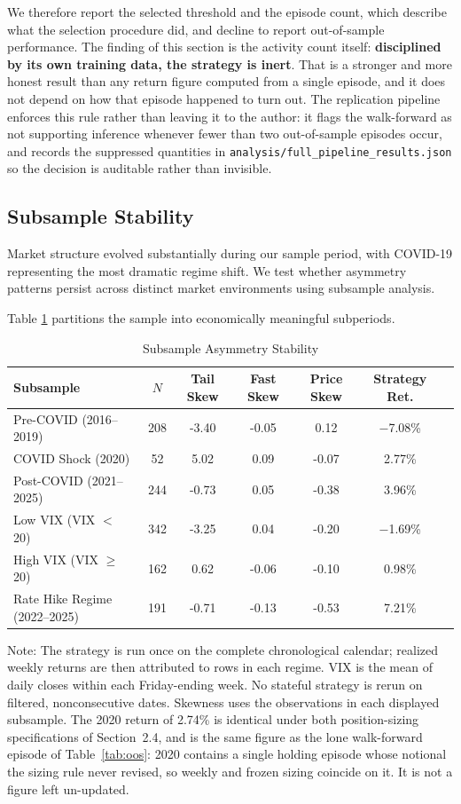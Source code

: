 \documentclass[11pt]{article}
\begin{document}
We therefore report the selected threshold and the episode count, which describe what the selection procedure did, and decline to report out-of-sample performance. The finding of this section is the activity count itself: \textbf{disciplined by its own training data, the strategy is inert}. That is a stronger and more honest result than any return figure computed from a single episode, and it does not depend on how that episode happened to turn out. The replication pipeline enforces this rule rather than leaving it to the author: it flags the walk-forward as not supporting inference whenever fewer than two out-of-sample episodes occur, and records the suppressed quantities in \texttt{analysis/full\_pipeline\_results.json} so the decision is auditable rather than invisible.

\subsection{Subsample Stability}

Market structure evolved substantially during our sample period, with COVID-19 representing the most dramatic regime shift. We test whether asymmetry patterns persist across distinct market environments using subsample analysis.

Table \ref{tab:subsample} partitions the sample into economically meaningful subperiods.

\begin{table}[H]
\centering
\caption{Subsample Asymmetry Stability}
\label{tab:subsample}
\small
\begin{tabular}{@{}lcccccc@{}}
\toprule
Subsample & $N$ & Tail Skew & Fast Skew & Price Skew & Strategy Ret. \\
\midrule
Pre-COVID (2016--2019) & 208 & -3.40 & -0.05 & 0.12 & $-$7.08\% \\
COVID Shock (2020) & 52 & 5.02 & 0.09 & -0.07 & 2.77\% \\
Post-COVID (2021--2025) & 244 & -0.73 & 0.05 & -0.38 & 3.96\% \\
Low VIX (VIX $<$ 20) & 342 & -3.25 & 0.04 & -0.20 & $-$1.69\% \\
High VIX (VIX $\geq$ 20) & 162 & 0.62 & -0.06 & -0.10 & 0.98\% \\
Rate Hike Regime (2022--2025) & 191 & -0.71 & -0.13 & -0.53 & 7.21\% \\
\bottomrule
\end{tabular}
\par\vspace{0.3em}
\parbox{\linewidth}{\footnotesize Note: The strategy is run once on the complete chronological calendar; realized weekly returns are then attributed to rows in each regime. VIX is the mean of daily closes within each Friday-ending week. No stateful strategy is rerun on filtered, nonconsecutive dates. Skewness uses the observations in each displayed subsample. The 2020 return of 2.74\% is identical under both position-sizing specifications of Section~2.4, and is the same figure as the lone walk-forward episode of Table~\ref{tab:oos}: 2020 contains a single holding episode whose notional the sizing rule never revised, so weekly and frozen sizing coincide on it. It is not a figure left un-updated.}
\end{table}
\end{document}
